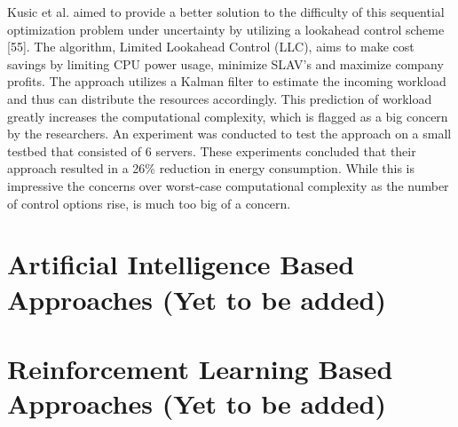 \documentclass[oneside,12pt]{Classes/RoboticsLaTeX}
\begin{document}
Kusic et al. aimed to provide a better solution to the difficulty of this sequential optimization problem under uncertainty by utilizing a lookahead control scheme [55]. The algorithm, Limited Lookahead Control (LLC), aims to make cost savings by limiting CPU power usage, minimize SLAV's and maximize company profits. The approach utilizes a Kalman filter to estimate the incoming workload and thus can distribute the resources accordingly. This prediction of workload greatly increases the computational complexity, which is flagged as a big concern by the researchers. An experiment was conducted to test the approach on a small testbed that consisted of 6 servers. These experiments concluded that their approach resulted in a 26\% reduction in energy consumption. While this is impressive the concerns over worst-case computational complexity as the number of control options rise, is much too big of a concern. 

\section{Artificial Intelligence Based Approaches (Yet to be added)}

\section{Reinforcement Learning Based Approaches (Yet to be added)}
\end{document}
